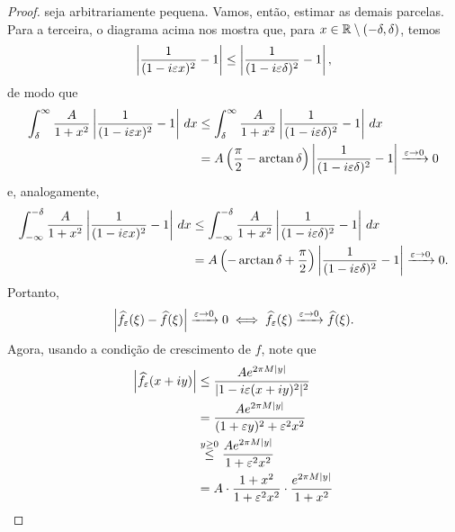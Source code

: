 \begin{proof}
            seja arbitrariamente pequena. Vamos, então, estimar as demais parcelas. Para a terceira, o diagrama
            acima nos mostra que, para $x\in\mathbb{R}\setminus (-\delta, \delta)$, temos
            \begin{align*}
                \left| \frac{1}{(1-i\varepsilon x)^2} - 1 \right| \leq \left| \frac{1}{(1-i\varepsilon\delta)^2} - 1 \right|,
            \end{align*}
            de modo que
            \begin{align*}
                \int_{\delta}^{\infty} \frac{A}{1+ x^2}\left| \frac{1}{(1-i\varepsilon x)^2} - 1 \right| \, dx
                &\leq \int_{\delta}^{\infty} \frac{A}{1+ x^2}\left| \frac{1}{(1-i\varepsilon\delta)^2} - 1 \right| \, dx \\
                &=  A\left( \frac{\pi}{2} - \arctan\delta \right) \left| \frac{1}{(1-i\varepsilon\delta)^2} - 1 \right| 
                \xrightarrow{\varepsilon\to 0} 0
            \end{align*}
            e, analogamente,
            \begin{align*}
                \int_{-\infty}^{-\delta} \frac{A}{1+ x^2}\left| \frac{1}{(1-i\varepsilon x)^2} - 1 \right| \, dx
                &\leq \int_{-\infty}^{-\delta} \frac{A}{1+ x^2}\left| \frac{1}{(1-i\varepsilon\delta)^2} - 1 \right| \, dx \\
                &=  A\left( -\arctan\delta + \frac{\pi}{2} \right) \left| \frac{1}{(1-i\varepsilon\delta)^2} - 1 \right| 
                \xrightarrow{\varepsilon\to 0} 0.
            \end{align*}
            Portanto,
            \begin{equation*}
                \left| \widehat{f_{\varepsilon}}(\xi) - \widehat{f}(\xi) \right| \xrightarrow{\varepsilon\to 0} 0 
                \iff \widehat{f_{\varepsilon}}(\xi) \xrightarrow{\varepsilon\to 0} \widehat{f}(\xi).
            \end{equation*}
            Agora, usando a condição de crescimento de $f$, note que
            \begin{align*}
                \left| \widehat{f_{\e}}(x+iy) \right| &\leq \frac{Ae^{2\pi M|y|}}{|1 - i\e (x+iy)^2|^2} \\
                &= \frac{Ae^{2\pi M|y|}}{(1+ \e y)^2 + \e^2x^2} \\
                &\stackrel{y\geq 0}{\leq} \frac{Ae^{2\pi M|y|}}{1 + \e^2x^2} \\
                &= A\cdot\frac{1+x^2}{1 + \e^2x^2}\cdot\frac{e^{2\pi M|y|}}{1 + x^2} \\

\end{align*}
\end{proof}
